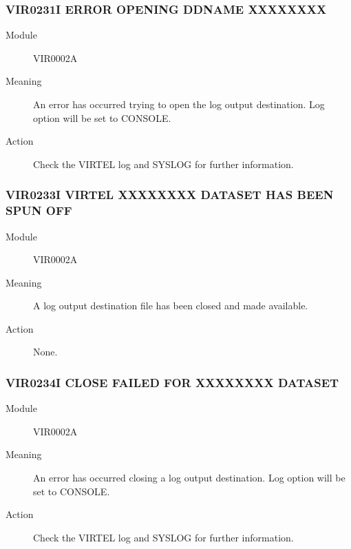\documentclass[letterpaper,10pt,english]{sphinxmanual}
\begin{document}
\subsubsection{VIR0231I ERROR OPENING DDNAME XXXXXXXX}
\label{\detokenize{messages:vir0231i-error-opening-ddname-xxxxxxxx}}\begin{description}
\item[{Module}] \leavevmode
VIR0002A

\item[{Meaning}] \leavevmode
An error has occurred trying to open the log output destination. Log option will be set to CONSOLE.

\item[{Action}] \leavevmode
Check the VIRTEL log and SYSLOG for further information.

\end{description}


\subsubsection{VIR0233I VIRTEL XXXXXXXX DATASET HAS BEEN SPUN OFF}
\label{\detokenize{messages:vir0233i-virtel-xxxxxxxx-dataset-has-been-spun-off}}\begin{description}
\item[{Module}] \leavevmode
VIR0002A

\item[{Meaning}] \leavevmode
A log output destination file has been closed and made available.

\item[{Action}] \leavevmode
None.

\end{description}


\subsubsection{VIR0234I CLOSE FAILED FOR XXXXXXXX DATASET}
\label{\detokenize{messages:vir0234i-close-failed-for-xxxxxxxx-dataset}}\begin{description}
\item[{Module}] \leavevmode
VIR0002A

\item[{Meaning}] \leavevmode
An error has occurred closing a log output destination. Log option will be set to CONSOLE.

\item[{Action}] \leavevmode
Check the VIRTEL log and SYSLOG for further information.

\end{description}
\end{document}
